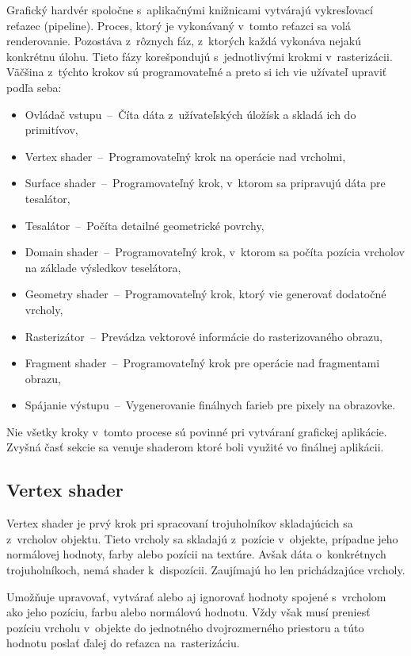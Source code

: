 Grafický hardvér spoločne s~aplikačnými knižnicami vytvárajú vykresľovací reťazec  \cite{GraphicsPipeline} (pipeline). Proces, ktorý je vykonávaný v~tomto reťazci sa volá renderovanie. Pozostáva z~rôznych fáz, z~ktorých každá vykonáva nejakú konkrétnu úlohu. Tieto fázy korešpondujú s~jednotlivými krokmi v~rasterizácii. Väčšina z~týchto krokov sú programovateľné a preto si ich vie užívateľ upraviť podľa seba:
\begin{itemize}
    \item Ovládač vstupu \,--\, Číta dáta z~užívateľských úložísk a skladá ich do primitívov,
    \item Vertex shader \,--\, Programovateľný krok na operácie nad vrcholmi,
    \item Surface shader \,--\, Programovateľný krok, v~ktorom sa pripravujú dáta pre tesalátor,
    \item Tesalátor \,--\, Počíta detailné geometrické povrchy,
    \item Domain shader \,--\, Programovateľný krok, v~ktorom sa počíta pozícia vrcholov na základe výsledkov teselátora,
    \item Geometry shader \,--\, Programovateľný krok, ktorý vie generovať dodatočné vrcholy,
    \item Rasterizátor \,--\, Prevádza vektorové informácie do rasterizovaného obrazu,
    \item Fragment shader \,--\, Programovateľný krok pre operácie nad fragmentami obrazu,
    \item Spájanie výstupu \,--\, Vygenerovanie finálnych farieb pre pixely na obrazovke.
\end{itemize}
Nie všetky kroky v~tomto procese sú povinné pri vytváraní grafickej aplikácie. Zvyšná časť sekcie sa venuje shaderom ktoré boli využité vo finálnej aplikácii.

\subsection*{Vertex shader}
Vertex shader \cite{RTRend} je prvý krok pri spracovaní trojuholníkov skladajúcich sa z~vrcholov objektu. Tieto vrcholy sa skladajú z~pozície v~objekte, prípadne jeho normálovej hodnoty, farby alebo pozícii na textúre. Avšak dáta o~konkrétnych trojuholníkoch, nemá shader k~dispozícii. Zaujímajú ho len prichádzajúce vrcholy.

Umožňuje upravovať, vytvárať alebo aj ignorovať hodnoty spojené s~vrcholom ako jeho pozíciu, farbu alebo normálovú hodnotu. Vždy však musí preniesť pozíciu vrcholu v~objekte do jednotného dvojrozmerného priestoru a túto hodnotu poslať ďalej do reťazca na~rasterizáciu. 

